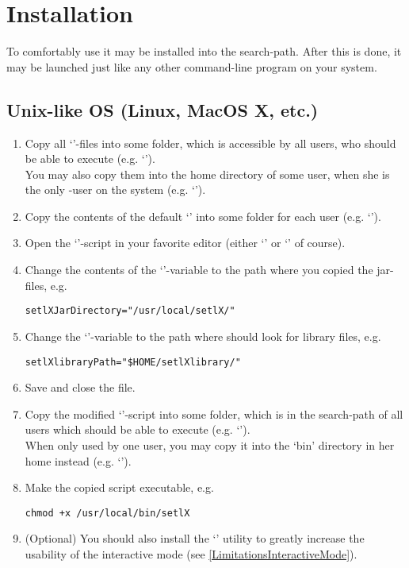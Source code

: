 \section{Installation}

To comfortably use \setlX{} it may be installed into the search-path. After this is done, it may be launched just like any other command-line program on your system.

\subsection{Unix-like OS (Linux, MacOS X, etc.)}

\begin{enumerate}
	\item Copy all `'-files into some folder, which is accessible by all users, who should be able to execute \setlX{} (e.g. `').\\
	You may also copy them into the home directory of some user, when she is the only \setlX-user on the system (e.g. `').
	\item Copy the contents of the default `' into some folder for each user (e.g. `').
	\item Open the `'-script in your favorite editor (either `' or `' of course).
	\item Change the contents of the `'-variable to the path where you copied the jar-files, e.g.
\begin{lstlisting}[frame=none,numbers=none]
setlXJarDirectory="/usr/local/setlX/"
\end{lstlisting}
	\item Change the `'-variable to the path where \setlX{} should look for library files, e.g.
\begin{lstlisting}[frame=none,numbers=none]
setlXlibraryPath="$HOME/setlXlibrary/"
\end{lstlisting}
	\item Save and close the file.
	\item Copy the modified `'-script into some folder, which is in the search-path of all users which should be able to execute \setlX{} (e.g. `').\\
	When only used by one user, you may copy it into the `bin' directory in her home instead (e.g. `').
	\item Make the copied script executable, e.g.
\begin{lstlisting}[frame=none,numbers=none]
chmod +x /usr/local/bin/setlX
\end{lstlisting}
	\item (Optional) You should also install the `' utility to greatly increase the usability of the interactive mode (see \ref{LimitationsInteractiveMode}). 

\end{enumerate}

